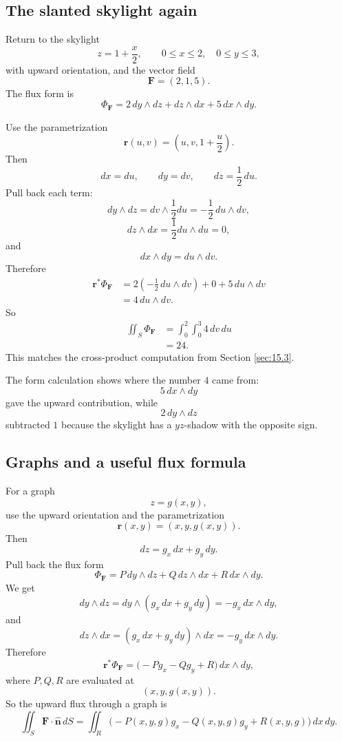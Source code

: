 \subsection{The slanted skylight again}

Return to the skylight
\[
    z=1+\frac{x}{2},
    \qquad
    0\le x\le2,\quad 0\le y\le3,
\]
with upward orientation, and the vector field
\[
    \mathbf F=(2,1,5).
\]
The flux form is
\[
    \Phi_{\mathbf F}
    =
    2\,dy\wedge dz
    +
    dz\wedge dx
    +
    5\,dx\wedge dy.
\]

Use the parametrization
\[
    \mathbf r(u,v)=\left(u,v,1+\frac u2\right).
\]
Then
\[
    dx=du,\qquad dy=dv,\qquad dz=\frac12\,du.
\]
Pull back each term:
\[
    dy\wedge dz
    =
    dv\wedge\frac12du
    =
    -\frac12\,du\wedge dv,
\]
\[
    dz\wedge dx
    =
    \frac12du\wedge du
    =
    0,
\]
and
\[
    dx\wedge dy
    =
    du\wedge dv.
\]
Therefore
\[
\begin{aligned}
    \mathbf r^*\Phi_{\mathbf F}
    &=
    2\left(-\frac12\,du\wedge dv\right)
    +
    0
    +
    5\,du\wedge dv\\
    &=
    4\,du\wedge dv.
\end{aligned}
\]
So
\[
\begin{aligned}
    \iint_S \Phi_{\mathbf F}
    &=
    \int_0^2\int_0^3 4\,dv\,du\\
    &=
    24.
\end{aligned}
\]
This matches the cross-product computation from Section \ref{sec:15.3}.

The form calculation shows where the number \(4\) came from:
\[
    5\,dx\wedge dy
\]
gave the upward contribution, while
\[
    2\,dy\wedge dz
\]
subtracted \(1\) because the skylight has a \(yz\)-shadow with the opposite sign.

\subsection{Graphs and a useful flux formula}

For a graph
\[
    z=g(x,y),
\]
use the upward orientation and the parametrization
\[
    \mathbf r(x,y)=(x,y,g(x,y)).
\]
Then
\[
    dz=g_x\,dx+g_y\,dy.
\]
Pull back the flux form
\[
    \Phi_{\mathbf F}
    =
    P\,dy\wedge dz
    +
    Q\,dz\wedge dx
    +
    R\,dx\wedge dy.
\]
We get
\[
    dy\wedge dz
    =
    dy\wedge(g_x\,dx+g_y\,dy)
    =
    -g_x\,dx\wedge dy,
\]
and
\[
    dz\wedge dx
    =
    (g_x\,dx+g_y\,dy)\wedge dx
    =
    -g_y\,dx\wedge dy.
\]
Therefore
\[
\boxed{
    \mathbf r^*\Phi_{\mathbf F}
    =
    \bigl(-P g_x-Q g_y+R\bigr)\,dx\wedge dy,
}
\]
where \(P,Q,R\) are evaluated at
\[
    (x,y,g(x,y)).
\]
So the upward flux through a graph is
\[
\boxed{
    \iint_S \mathbf F\cdot\widehat{\mathbf n}\,dS
    =
    \iint_R
    \bigl(-P(x,y,g)g_x-Q(x,y,g)g_y+R(x,y,g)\bigr)\,dx\,dy.
}
\]

